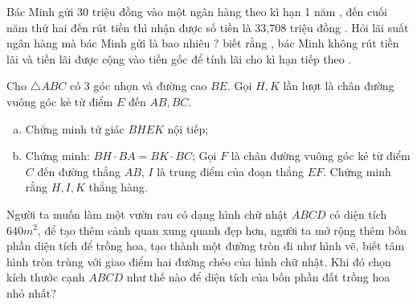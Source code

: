 \begin{ex} %
	Bác Minh gửi 30 triệu đồng vào một ngân hàng theo kì hạn 1 năm , đến cuối năm thứ hai đến rút tiền thì nhận được số tiền là 33,708 triệu đồng . Hỏi lãi suất ngân hàng mà bác Minh gửi là bao nhiêu ? biết rằng , bác Minh không rút tiền lãi và tiền lãi được cộng vào tiền gốc để tính lãi cho kì hạn tiếp theo .
\end{ex}
\begin{ex} %
	Cho $\triangle ABC$ có 3 góc nhọn và đường cao $BE$. Gọi $H, K$ lần lượt là chân đường vuông góc kẻ từ điểm $E$ đến $AB, BC$.
	\begin{enumerate}[a)]
		\item Chứng minh tứ giác $BHEK$ nội tiếp;
		\item Chứng minh: $BH \cdot BA = BK \cdot BC$; Gọi $F$ là chân đường vuông góc kẻ từ điểm $C$ đến đường thẳng $AB$, $I$ là trung điểm của đoạn thẳng $EF$. Chứng minh rằng $H,I,K$ thẳng hàng.
	\end{enumerate}
	\loigiai{}
\end{ex}

\begin{ex} Người ta muốn làm một vườn rau có dạng hình chữ nhật $ABCD$ có diện tích $640m^2$, để tạo thêm cảnh quan xung quanh đẹp hơn, người ta mở rộng thêm bốn phần diện tích để trồng hoa, tạo thành một đường tròn đi như hình vẽ, biết tâm hình tròn trùng với giao điểm hai đường chéo của hình chữ nhật. Khi đó chọn kích thước cạnh $ABCD$ như thế nào để diện tích của bốn phần đất trồng hoa nhỏ nhất?

\end{ex}

